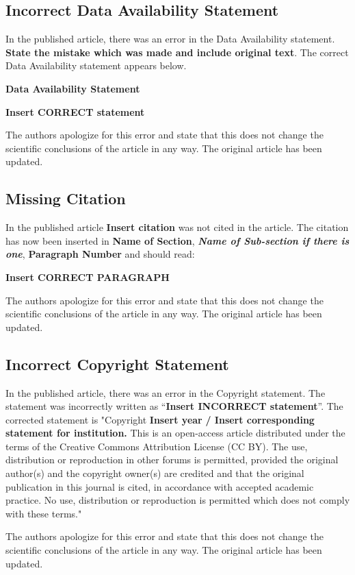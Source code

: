 \documentclass[utf8]{frontiers_correction}
\begin{document}
\vspace{5mm}
\subsection*{Incorrect Data Availability Statement}
In the published article, there was an error in the Data Availability statement. \textbf{State the mistake which was made and include original text}. The correct Data Availability statement appears below.\par
\textbf{Data Availability Statement}\par
\textbf{Insert CORRECT statement}\par
The authors apologize for this error and state that this does not change the scientific conclusions of the article in any way. The original article has been updated.


\vspace{5mm}
\subsection*{Missing Citation}
In the published article \textbf{Insert citation} was not cited in the article. The citation has now been inserted in \textbf{Name of Section}, \textbf{\textit{Name of Sub-section if there is one}}, \textbf{Paragraph Number} and should read:\par
\textbf{Insert CORRECT PARAGRAPH}\par
The authors apologize for this error and state that this does not change the scientific conclusions of the article in any way. The original article has been updated.


\vspace{5mm}
\subsection*{Incorrect Copyright Statement}
In the published article, there was an error in the Copyright statement. The statement was incorrectly written as “\textbf{Insert INCORRECT statement}”. The corrected statement is "Copyright \textcopyright \textbf{ Insert year} \textbf{/ Insert corresponding statement for institution.} This is an open-access article distributed under the terms of the Creative Commons Attribution License (CC BY). The use, distribution or reproduction in other forums is permitted, provided the original author(s) and the copyright owner(s) are credited and that the original publication in this journal is cited, in accordance with accepted academic practice. No use, distribution or reproduction is permitted which does not comply with these terms."\par
The authors apologize for this error and state that this does not change the scientific conclusions of the article in any way. The original article has been updated.
\end{document}

